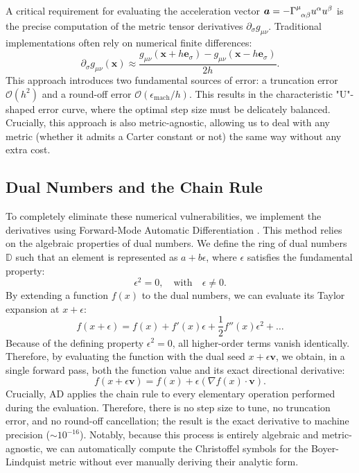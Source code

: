 \documentclass[11pt]{book}
\begin{document}
A critical requirement for evaluating the acceleration vector \(\bm{a} = -\tensor{\Gamma}{^\mu_\alpha_\beta} u^\alpha u^\beta\) is the precise computation of the metric tensor derivatives \(\partial_\sigma g_{\mu\nu}\). Traditional implementations often rely on numerical finite differences:
\begin{equation}
    \partial_\sigma g_{\mu\nu}(\bm{x}) \approx \frac{g_{\mu\nu}(\bm{x} + h \bm{e}_\sigma) - g_{\mu\nu}(\bm{x} - h \bm{e}_\sigma)}{2h}.
\end{equation}
This approach introduces two fundamental sources of error: a truncation error \(\mathcal{O}(h^2)\) and a round-off error \(\mathcal{O}(\epsilon_{\text{mach}} / h)\). This results in the characteristic "U"-shaped error curve, where the optimal step size must be delicately balanced. Crucially, this approach is also metric-agnostic, allowing us to deal with any metric (whether it admits a Carter constant or not) the same way without any extra cost.

\subsection{Dual Numbers and the Chain Rule}
To completely eliminate these numerical vulnerabilities, we implement the derivatives using Forward-Mode Automatic Differentiation \cite{Wengert1964-sd, Griewank2008-dl, Revels2016}. This method relies on the algebraic properties of dual numbers. We define the ring of dual numbers \(\mathbb{D}\) such that an element is represented as \(a + b\epsilon\), where \(\epsilon\) satisfies the fundamental property:
\begin{equation}
    \epsilon^2 = 0, \quad \text{with} \quad \epsilon \neq 0.
\end{equation}
By extending a function \(f(x)\) to the dual numbers, we can evaluate its Taylor expansion at \(x + \epsilon\):
\begin{equation}
    f(x + \epsilon) = f(x) + f'(x)\epsilon + \frac{1}{2}f''(x)\epsilon^2 + \dots
\end{equation}
Because of the defining property \(\epsilon^2 = 0\), all higher-order terms vanish identically. Therefore, by evaluating the function with the dual seed \(x + \epsilon \bm{v}\), we obtain, in a single forward pass, both the function value and its exact directional derivative:
\begin{equation}
    f(x + \epsilon \bm{v}) = f(x) + \epsilon \left( \nabla f(x) \cdot \bm{v} \right).
\end{equation}
Crucially, AD applies the chain rule to every elementary operation performed during the evaluation. Therefore, there is no step size to tune, no truncation error, and no round-off cancellation; the result is the exact derivative to machine precision (\(\sim 10^{-16}\)). Notably, because this process is entirely algebraic and metric-agnostic, we can automatically compute the Christoffel symbols for the Boyer-Lindquist metric without ever manually deriving their analytic form.
\end{document}

